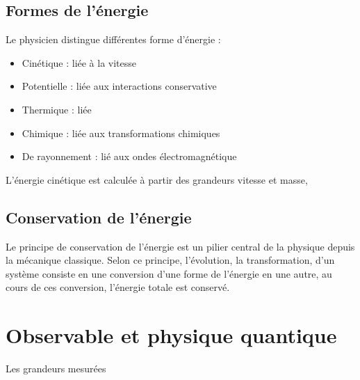 %
  \subsection{Formes de l'énergie}

Le physicien distingue différentes forme d'énergie :

	\begin{itemize}[leftmargin=1cm, label=, itemsep=1pt]
		\item Cinétique : liée à la vitesse
		\item Potentielle : liée aux interactions conservative
		\item Thermique : liée 
		\item Chimique : liée aux transformations chimiques
		\item De rayonnement : lié aux ondes électromagnétique
	\end{itemize}

L'énergie cinétique est calculée à partir des grandeurs vitesse et masse, 
%
  \subsection{Conservation de l'énergie}

Le principe de conservation de l'énergie est un pilier central de la physique depuis la mécanique classique. Selon ce principe, l'évolution, la transformation, d'un système consiste en une conversion d'une forme de l'énergie en une autre, au cours de ces conversion, l'énergie totale est conservé.

\section{Observable et physique quantique}
%
Les grandeurs mesurées


